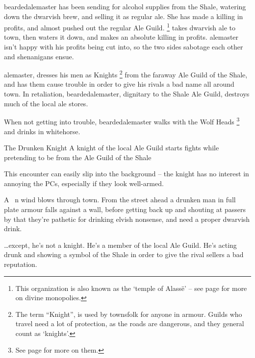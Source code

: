 \begin{multicols}{2}

\label{troubleAle}

\startcontents[sq]

\sqminitoc

\noindent
\Gls{beardedalemaster} has been sending for alcohol supplies from the Shale, watering down the dwarvish brew, and selling it as regular ale.
She has made a killing in profits, and almost pushed out the regular Ale Guild.%
\footnote{This organization is also known as the `temple of Alass\"{e}' -- see page \pageref{guilds} for more on divine monopolies.}
takes dwarvish ale to \gls{town}, then waters it down, and makes an absolute killing in profits.
\Gls{alemaster} isn't happy with his profits being cut into, so the two sides sabotage each other and shenanigans ensue.

\Gls{alemaster}, dresses his men as Knights%
\footnote{The term ``Knight'', is used by townsfolk for anyone in armour.
Guilds who travel need a lot of protection, as the roads are dangerous, and they general count as `knights'.}
from the faraway Ale Guild of the Shale, and has them cause trouble in order to give his rivals a bad name all around \gls{town}.
In retaliation, \gls{beardedalemaster}, dignitary to the Shale Ale Guild, destroys much of the local ale stores.

When not getting into trouble, \Gls{beardedalemaster} walks with the Wolf Heads%
\footnote{See page \pageref{beardedalemaster} for more on them.}
and drinks in \gls{whitehorse}.

{The Drunken Knight}%
{A knight of the local Ale Guild starts fights while pretending to be from the Ale Guild of the Shale}%

This encounter can easily slip into the background -- the knight has no interest in annoying the PCs, especially if they look well-armed.

\begin{boxtext}

  A \seasonDesc\ \season n wind blows through \gls{town}.
  From the street ahead a drunken man in full plate armour falls against a wall, before getting back up and shouting at passers by that they're pathetic for drinking elvish nonsense, and need a proper dwarvish drink.

\end{boxtext}

\ldots except, he's not a knight.
He's a member of the local Ale Guild.
He's acting drunk and showing a symbol of the Shale in order to give the rival sellers a bad reputation.


\end{multicols}
